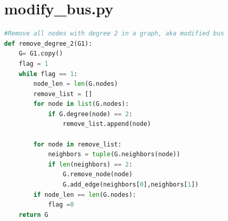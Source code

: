 \documentclass[12pt]{article}
\begin{document}
\section{modify\_bus.py}
\begin{lstlisting}[breaklines=true,language=Python]
#Remove all nodes with degree 2 in a graph, aka modified bus
def remove_degree_2(G1):
    G= G1.copy()
    flag = 1
    while flag == 1:
        node_len = len(G.nodes)
        remove_list = []
        for node in list(G.nodes):
            if G.degree(node) == 2:
                remove_list.append(node)
        
        for node in remove_list:
            neighbors = tuple(G.neighbors(node))
            if len(neighbors) == 2:
                G.remove_node(node)
                G.add_edge(neighbors[0],neighbors[1])
        if node_len == len(G.nodes):
            flag =0
    return G
\end{lstlisting}
\end{document}
